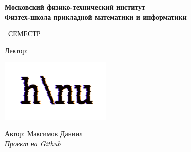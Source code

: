 \begin{titlepage}
	\clearpage\thispagestyle{empty}
	\centering
	
	\textbf{Московский физико-технический институт \\ Физтех-школа прикладной математики и информатики}
	\vspace{33ex}
	
	{\textbf{\FullCourseNameFirstPart}}
	
	\SemesterNumber\ СЕМЕСТР  
	\vspace{1ex}
	
	Лектор: \textit{\LecturerInitials}
	
	\includegraphics[width=0.4\textwidth]{images/logo_ltc.png}

	\begin{flushright}
		\noindent
		Автор: \href{\TelegramLink}{Максимов Даниил}
		\\
		\href{\GithubLink}{\textit{Проект на Github}}
	\end{flushright}
	
	\vfill
	\CourseDate
	\pagebreak
\end{titlepage}
